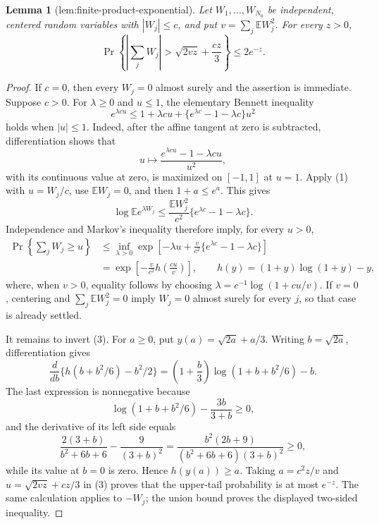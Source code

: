 \documentclass{article}
\newtheorem{lemma}{Lemma}
\begin{document}
\begin{lemma}[lem:finite-product-exponential]\label{lem:finite-product-exponential}
Let \(W_1,\ldots,W_{N_0}\) be independent, centered random variables with \(|W_j|\le c\), and put \(v=\sum_j\mathbb E W_j^2\). For every \(z>0\),
\[
 \Pr\!\left\{\left|\sum_jW_j\right|>
 \sqrt{2vz}+\frac{cz}{3}\right\}\le 2e^{-z}.
\]
\end{lemma}
\begin{proof}
If \(c=0\), then every \(W_j=0\) almost surely and the assertion is immediate.  Suppose \(c>0\).  For \(\lambda\ge0\) and \(u\le1\), the elementary Bennett inequality
\[
 e^{\lambda c u}\le
 1+\lambda c u+
 \{e^{\lambda c}-1-\lambda c\}u^2
\tag{1}
\]
holds when \(|u|\le1\).  Indeed, after the affine tangent at zero is subtracted, differentiation shows that
\[
 u\longmapsto\frac{e^{\lambda c u}-1-\lambda c u}{u^2},
\]
with its continuous value at zero, is maximized on \([-1,1]\) at \(u=1\).  Apply (1) with \(u=W_j/c\), use \(\mathbb EW_j=0\), and then \(1+a\le e^a\).  This gives
\[
 \log\mathbb E e^{\lambda W_j}
 \le \frac{\mathbb EW_j^2}{c^2}
       \{e^{\lambda c}-1-\lambda c\}.
\tag{2}
\]
Independence and Markov's inequality therefore imply, for every \(u>0\),
\[
\begin{aligned}
 \Pr\!\left\{\sum_jW_j\ge u\right\}
 &\le\inf_{\lambda>0}
 \exp\!\left[-\lambda u+\frac v{c^2}
       \{e^{\lambda c}-1-\lambda c\}\right]  \\
 &=\exp\!\left[-\frac v{c^2}
 h\!\left(\frac{cu}{v}\right)\right],
 \qquad h(y)=(1+y)\log(1+y)-y ,
\end{aligned}
\tag{3}
\]
where, when \(v>0\), equality follows by choosing
\(\lambda=c^{-1}\log(1+cu/v)\).  If \(v=0\), centering and
\(\sum_j\mathbb EW_j^2=0\) imply \(W_j=0\) almost surely for every
\(j\), so that case is already settled.

It remains to invert (3).  For \(a\ge0\), put
\(y(a)=\sqrt{2a}+a/3\).  Writing \(b=\sqrt{2a}\), differentiation gives
\[
 \frac{d}{db}\{h(b+b^2/6)-b^2/2\}
 =\left(1+\frac b3\right)\log(1+b+b^2/6)-b .
\]
The last expression is nonnegative because
\[
 \log(1+b+b^2/6)-\frac{3b}{3+b}\ge0,
\]
and the derivative of its left side equals
\[
 \frac{2(3+b)}{b^2+6b+6}-\frac9{(3+b)^2}
 =\frac{b^2(2b+9)}
 {(b^2+6b+6)(3+b)^2}\ge0,
\]
while its value at \(b=0\) is zero.  Hence \(h(y(a))\ge a\).
Taking \(a=c^2z/v\) and
\(u=\sqrt{2vz}+cz/3\) in (3) proves that the upper-tail probability
is at most \(e^{-z}\).  The same calculation applies to \(-W_j\);
the union bound proves the displayed two-sided inequality.
\end{proof}
\end{document}
